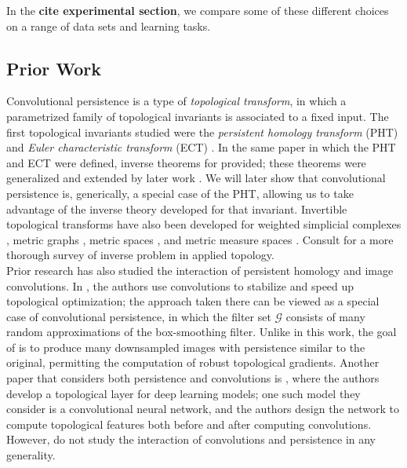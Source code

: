 \documentclass[conference]{IEEEtran}
\theoremstyle{definition}
\numberwithin{figure}{section}
\begin{document}
In the {\bf cite experimental section}, we compare some of these different choices on a range of data sets and learning tasks.

\subsection{Prior Work}
Convolutional persistence is a type of \emph{topological transform}, in which a parametrized family of topological invariants is associated to a fixed input. The first topological invariants studied were the \emph{persistent homology transform} (PHT) and \emph{Euler characteristic transform} (ECT) \cite{turner2014persistent}. In the same paper in which the PHT and ECT were defined, inverse theorems for provided; these theorems were generalized and extended by later work \cite{curry2018many,ghrist2018persistent}. We will later show that convolutional persistence is, generically, a special case of the PHT, allowing us to take advantage of the inverse theory developed for that invariant. Invertible topological transforms have also been developed for weighted simplicial complexes \cite{jiang2020weighted}, metric graphs \cite{oudot2017barcode}, metric spaces \cite{solomon2021geometry}, and metric measure spaces \cite{maria2019intrinsic}. Consult \cite{oudot2020inverse} for a more thorough survey of inverse problem in applied topology.\\

Prior research has also studied the interaction of persistent homology and image convolutions. In \cite{solomon2021fast}, the authors use convolutions to stabilize and speed up topological optimization; the approach taken there can be viewed as a special case of convolutional persistence, in which the filter set $\mathcal{G}$ consists of many random approximations of the box-smoothing filter. Unlike in this work, the goal of \cite{solomon2021fast} is to produce many downsampled images with persistence similar to the original, permitting the computation of robust topological gradients. Another paper that considers both persistence and convolutions is \cite{kim2020pllay}, where the authors develop a topological layer for deep learning models; one such model they consider is a convolutional neural network, and the authors design the network to compute topological features both before and after computing convolutions. However, \cite{kim2020pllay} do not study the interaction of convolutions and persistence in any generality. \\
\end{document}
